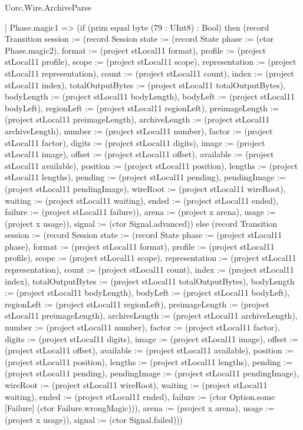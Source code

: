 \begin{lexlean}{Uorc.Wire.ArchiveParse}
\begin{semanticmodule}
{    | Phase.magic1 => (if (prim equal byte (79 : UInt8) : Bool) then (record Transition {session := (record Session {state := (record State {phase := (ctor Phase.magic2), format := (project stLocal11 format), profile := (project stLocal11 profile), scope := (project stLocal11 scope), representation := (project stLocal11 representation), count := (project stLocal11 count), index := (project stLocal11 index), totalOutputBytes := (project stLocal11 totalOutputBytes), bodyLength := (project stLocal11 bodyLength), bodyLeft := (project stLocal11 bodyLeft), regionLeft := (project stLocal11 regionLeft), preimageLength := (project stLocal11 preimageLength), archiveLength := (project stLocal11 archiveLength), number := (project stLocal11 number), factor := (project stLocal11 factor), digits := (project stLocal11 digits), image := (project stLocal11 image), offset := (project stLocal11 offset), available := (project stLocal11 available), position := (project stLocal11 position), lengths := (project stLocal11 lengths), pending := (project stLocal11 pending), pendingImage := (project stLocal11 pendingImage), wireRoot := (project stLocal11 wireRoot), waiting := (project stLocal11 waiting), ended := (project stLocal11 ended), failure := (project stLocal11 failure)}), arena := (project x arena), usage := (project x usage)}), signal := (ctor Signal.advanced)}) else (record Transition {session := (record Session {state := (record State {phase := (project stLocal11 phase), format := (project stLocal11 format), profile := (project stLocal11 profile), scope := (project stLocal11 scope), representation := (project stLocal11 representation), count := (project stLocal11 count), index := (project stLocal11 index), totalOutputBytes := (project stLocal11 totalOutputBytes), bodyLength := (project stLocal11 bodyLength), bodyLeft := (project stLocal11 bodyLeft), regionLeft := (project stLocal11 regionLeft), preimageLength := (project stLocal11 preimageLength), archiveLength := (project stLocal11 archiveLength), number := (project stLocal11 number), factor := (project stLocal11 factor), digits := (project stLocal11 digits), image := (project stLocal11 image), offset := (project stLocal11 offset), available := (project stLocal11 available), position := (project stLocal11 position), lengths := (project stLocal11 lengths), pending := (project stLocal11 pending), pendingImage := (project stLocal11 pendingImage), wireRoot := (project stLocal11 wireRoot), waiting := (project stLocal11 waiting), ended := (project stLocal11 ended), failure := (ctor Option.some [Failure] (ctor Failure.wrongMagic))}), arena := (project x arena), usage := (project x usage)}), signal := (ctor Signal.failed)}))
}
\end{semanticmodule}
\end{lexlean}
